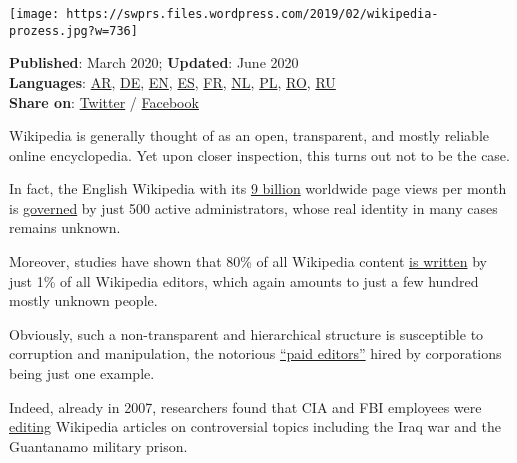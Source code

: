 \texttt{[image: https://swprs.files.wordpress.com/2019/02/wikipedia-prozess.jpg?w=736]}

\textbf{Published}: March 2020; \textbf{Updated}: June 2020\\
\textbf{Languages}:
\href{https://swprs.files.wordpress.com/2020/03/wikipedia-disinformation-operation-arabic.pdf}{AR},
\href{https://swprs.org/propaganda-in-der-wikipedia/}{DE},
\href{https://swprs.org/wikipedia-disinformation-operation/}{EN},
\href{https://swprs.files.wordpress.com/2020/03/wikipedia-disinformation-operation-spanish.pdf}{ES},
\href{https://lumieresurgaia.com/wikipedia-une-operation-de-desinformation/}{FR},
\href{https://swprs.files.wordpress.com/2020/03/wikipedia-disinformation-operation-dutch.pdf}{NL},
\href{https://swprs.files.wordpress.com/2020/03/wikipedia-disinformation-operation-polish.pdf}{PL},
\href{https://evz.ro/wikipedia-o-operatie-de-dezinformare-cine-se-ascunde-in-spatele-acestei-enciclopedii-online.html/2}{RO},
\href{https://kiwibyrd.org/2020/03/20/20h33/}{RU}\\
\textbf{Share on}:
\href{https://twitter.com/intent/tweet?url=https://swprs.org/wikipedia-disinformation-operation/}{Twitter}
/
\href{https://www.facebook.com/share.php?u=https://swprs.org/wikipedia-disinformation-operation/}{Facebook}

Wikipedia is generally thought of as an open, transparent, and mostly
reliable online encyclopedia. Yet upon closer inspection, this turns out
not to be the case.

In fact, the English Wikipedia with its
\href{https://stats.wikimedia.org/\#/en.wikipedia.org}{9 billion}
worldwide page views per month is
\href{https://en.wikipedia.org/wiki/Wikipedia:List_of_administrators}{governed}
by just 500 active administrators, whose real identity in many cases
remains unknown.

Moreover, studies have shown that 80\% of all Wikipedia content
\href{https://www.purdue.edu/newsroom/releases/2017/Q4/results-of-wikipedia-study-may-surprise.html}{is
written} by just 1\% of all Wikipedia editors, which again amounts to
just a few hundred mostly unknown people.

Obviously, such a non-transparent and hierarchical structure is
susceptible to corruption and manipulation, the notorious
\href{https://www.theatlantic.com/business/archive/2015/08/wikipedia-editors-for-pay/393926/}{``paid
editors''} hired by corporations being just one example.

Indeed, already in 2007, researchers found that CIA and FBI employees
were
\href{https://www.reuters.com/article/us-security-wikipedia/cia-fbi-computers-used-for-wikipedia-edits-idUSN1642896020070816}{editing}
Wikipedia articles on controversial topics including the Iraq war and
the Guantanamo military prison.

